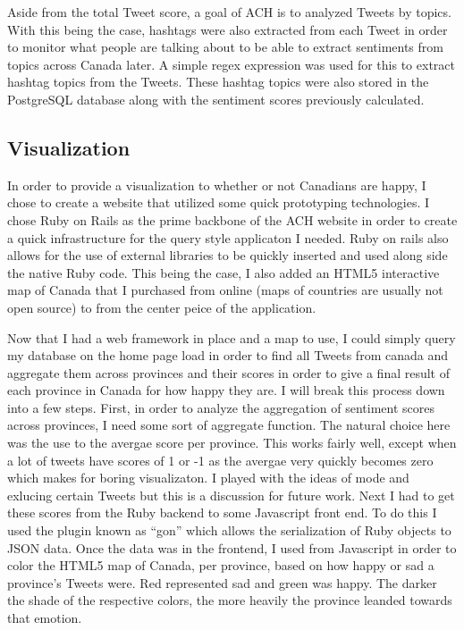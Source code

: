 \documentclass[conference]{IEEEtran}
\begin{document}
Aside from the total Tweet score, a goal of ACH is to analyzed Tweets by topics. With this being the case,
hashtags were also extracted from each Tweet in order to monitor what people are talking about to be able
to extract sentiments from topics across Canada later. A simple regex expression was used for this to
extract hashtag topics from the Tweets. These hashtag topics were also stored in the PostgreSQL database
along with the sentiment scores previously calculated.

\subsection{Visualization}

In order to provide a visualization to whether or not Canadians are happy, I chose to create a website
that utilized some quick prototyping technologies. I chose Ruby on Rails as the prime backbone of the ACH
website in order to create a quick infrastructure for the query style applicaton I needed. Ruby on rails
also allows for the use of external libraries to be quickly inserted and used along side the native Ruby
code. This being the case, I also added an HTML5 interactive map of Canada that I purchased from online
(maps of countries are usually not open source) to from the center peice of the application.

Now that I had a web framework in place and a map to use, I could simply query my database on the
home page load in order to find all Tweets from canada and aggregate them across provinces and their
scores in order to give a final result of each province in Canada for how happy they are. I will break
this process down into a few steps. First, in order to analyze the aggregation of sentiment scores
across provinces, I need some sort of aggregate function. The natural choice here was the use to the
avergae score per province. This works fairly well, except when a lot of tweets have scores of 1 or -1 
as the avergae very quickly becomes zero which makes for boring visualizaton. I played with the ideas of
mode and exlucing certain Tweets but this is a discussion for future work. Next I had to get these scores
from the Ruby backend to some Javascript front end. To do this I used the plugin known as ``gon'' which allows
the serialization of Ruby objects to JSON data. Once the data was in the frontend, I used from Javascript
in order to color the HTML5 map of Canada, per province, based on how happy or sad a province's Tweets
were. Red represented sad and green was happy. The darker the shade of the respective colors, the more
heavily the province leanded towards that emotion. 
\end{document}
